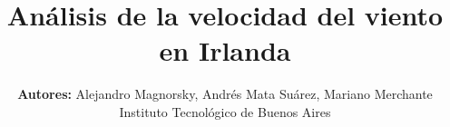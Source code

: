 \documentclass[journal, monochrome]{IEEEtran}
\begin{document}
%
\title{Análisis de la velocidad del viento en Irlanda}
%
%
%

\author{\textbf{Autores:} Alejandro Magnorsky, Andrés Mata Suárez, Mariano Merchante \\[5px]
        Instituto Tecnológico de Buenos Aires}
        
% 
%



% 




\end{document}
